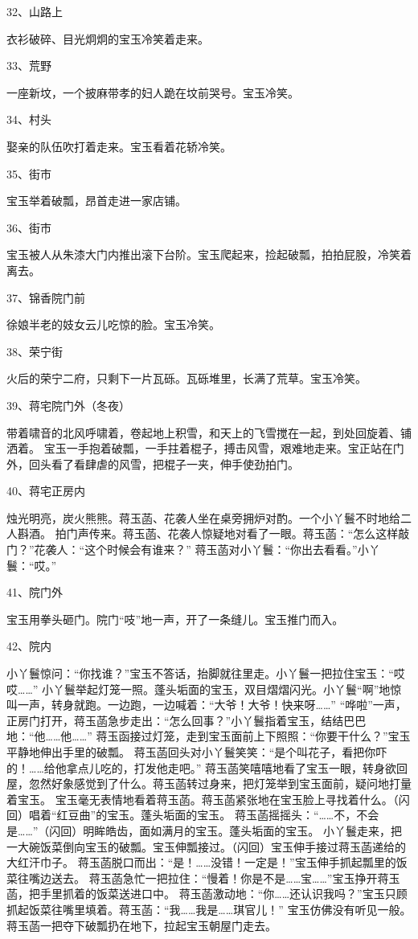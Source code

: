 32、山路上\par
衣衫破碎、目光炯炯的宝玉冷笑着走来。

33、荒野\par
一座新坟，一个披麻带孝的妇人跪在坟前哭号。宝玉冷笑。

34、村头\par
娶亲的队伍吹打着走来。宝玉看着花轿冷笑。

35、街市\par
宝玉举着破瓢，昂首走进一家店铺。

36、街市\par
宝玉被人从朱漆大门内推出滚下台阶。宝玉爬起来，捡起破瓢，拍拍屁股，冷笑着离去。

37、锦香院门前\par
徐娘半老的妓女云儿吃惊的脸。宝玉冷笑。

38、荣宁街\par
火后的荣宁二府，只剩下一片瓦砾。瓦砾堆里，长满了荒草。宝玉冷笑。

39、蒋宅院门外（冬夜）\par
带着啸音的北风呼啸着，卷起地上积雪，和天上的飞雪搅在一起，到处回旋着、铺洒着。
宝玉一手抱着破瓢，一手拄着棍子，搏击风雪，艰难地走来。宝正站在门外，回头看了看肆虐的风雪，把棍子一夹，伸手使劲拍门。

40、蒋宅正房内\par
烛光明亮，炭火熊熊。蒋玉菡、花袭人坐在桌旁拥炉对酌。一个小丫鬟不时地给二人斟酒。
拍门声传来。蒋玉菡、花袭人惊疑地对看了一眼。蒋玉菡：“怎么这样敲门？”花袭人：“这个时候会有谁来？”
蒋玉菡对小丫鬟：“你出去看看。”小丫鬟：“哎。”

41、院门外\par
宝玉用拳头砸门。院门“吱”地一声，开了一条缝儿。宝玉推门而入。

42、院内\par
小丫鬟惊问：“你找谁？”宝玉不答话，抬脚就往里走。小丫鬟一把拉住宝玉：“哎哎……”
小丫鬟举起灯笼一照。蓬头垢面的宝玉，双目熠熠闪光。小丫鬟“啊”地惊叫一声，转身就跑。一边跑，一边喊着：“大爷！大爷！快来呀……”
“哗啦”一声，正房门打开，蒋玉菡急步走出：“怎么回事？”小丫鬟指着宝玉，结结巴巴地：“他……他……”
蒋玉函接过灯笼，走到宝玉面前上下照照：“你要干什么？”宝玉平静地伸出手里的破瓢。
蒋玉菡回头对小丫鬟笑笑：“是个叫花子，看把你吓的！……给他拿点儿吃的，打发他走吧。”
蒋玉菡笑嘻嘻地看了宝玉一眼，转身欲回屋，忽然好象感觉到了什么。蒋玉菡转过身来，把灯笼举到宝玉面前，疑问地打量着宝玉。
宝玉毫无表情地看着蒋玉菡。蒋玉菡紧张地在宝玉脸上寻找着什么。（闪回）唱着“红豆曲”的宝玉。蓬头垢面的宝玉。
蒋玉菡摇摇头：“……不，不会是……”（闪回）明眸皓齿，面如满月的宝玉。蓬头垢面的宝玉。
小丫鬟走来，把一大碗饭菜倒向宝玉的破瓢。宝玉伸瓢接过。（闪回）宝玉伸手接过蒋玉菡递给的大红汗巾子。
蒋玉菡脱口而出：“是！……没错！一定是！”宝玉伸手抓起瓢里的饭菜往嘴边送去。
蒋玉菡急忙一把拉住：“慢着！你是不是……宝……”宝玉挣开蒋玉菡，把手里抓着的饭菜送进口中。
蒋玉菡激动地：“你……还认识我吗？”宝玉只顾抓起饭菜往嘴里填着。蒋玉菡：“我……我是……琪官儿！”
宝玉仿佛没有听见一般。蒋玉菡一把夺下破瓢扔在地下，拉起宝玉朝屋门走去。

